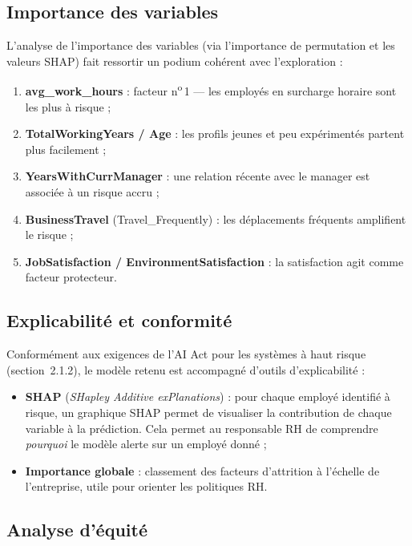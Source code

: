 \subsection{Importance des variables}

L'analyse de l'importance des variables (via l'importance de permutation et les valeurs SHAP) fait ressortir un podium cohérent avec l'exploration :

\begin{enumerate}
    \item \textbf{avg\_work\_hours} : facteur n\textsuperscript{o}\,1 --- les employés en surcharge horaire sont les plus à risque ;
    \item \textbf{TotalWorkingYears / Age} : les profils jeunes et peu expérimentés partent plus facilement ;
    \item \textbf{YearsWithCurrManager} : une relation récente avec le manager est associée à un risque accru ;
    \item \textbf{BusinessTravel} (Travel\_Frequently) : les déplacements fréquents amplifient le risque ;
    \item \textbf{JobSatisfaction / EnvironmentSatisfaction} : la satisfaction agit comme facteur protecteur.
\end{enumerate}

\subsection{Explicabilité et conformité}

Conformément aux exigences de l'AI Act pour les systèmes à haut risque (section~2.1.2), le modèle retenu est accompagné d'outils d'explicabilité :
\begin{itemize}
    \item \textbf{SHAP} (\textit{SHapley Additive exPlanations}) : pour chaque employé identifié à risque, un graphique SHAP permet de visualiser la contribution de chaque variable à la prédiction. Cela permet au responsable RH de comprendre \textit{pourquoi} le modèle alerte sur un employé donné ;
    \item \textbf{Importance globale} : classement des facteurs d'attrition à l'échelle de l'entreprise, utile pour orienter les politiques RH.
\end{itemize}

\subsection{Analyse d'équité}

